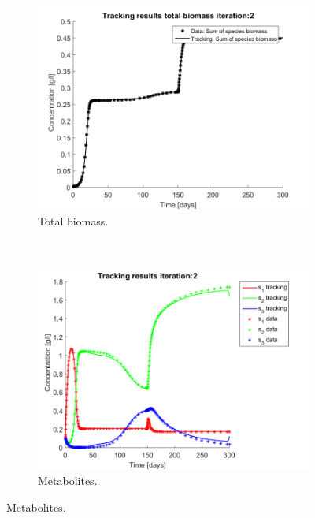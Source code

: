 \documentclass[3p,times]{article}
\begin{document}
\begin{figure}[h]
	\centering
	\begin{subfigure}{0.45 \linewidth}
	\includegraphics[width= \textwidth]{proof_of_concept/250309_POC_try3_iter_2_Biomass}
	\caption{Total biomass.}
	\label{PC_total_biomass}
	\end{subfigure}
~
	\begin{subfigure}{0.45 \linewidth}
		\includegraphics[width=\textwidth]{proof_of_concept/250309_POC_try3_iter_2_metabolites}
		\caption{Metabolites. }
		\label{PC_metabolites}
	\end{subfigure}


\end{figure}
\end{document}
